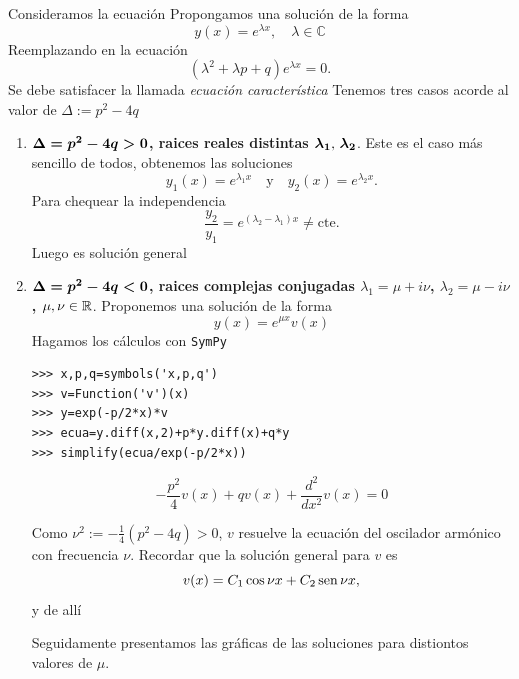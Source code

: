 Consideramos la ecuación
Propongamos una solución de la forma
\[\boxed{y(x)=e^{\lambda x},\quad \lambda\in\mathbb{C}}\]
Reemplazando en la ecuación
\[(\lambda^2+\lambda p+q)e^{\lambda x}=0.\]
Se debe satisfacer la llamada \emph{ecuación característica}
Tenemos tres casos acorde al valor de $\Delta:=p^2-4q$

\begin{enumerate}

\item \noindent \textbf{ $\b{\Delta=p^2-4q>0}$, raices reales distintas $\b{\lambda_1$, $\lambda_2}$}. Este es el caso más sencillo de todos, obtenemos las soluciones
\[y_1(x)=e^{\lambda_1 x}\quad\text{y}\quad y_2(x)=e^{\lambda_2 x}.\]
Para chequear la independencia
\[\frac{y_2}{y_1}=e^{(\lambda_2-\lambda_1)x}\neq\text{cte}.\]
Luego
es solución general


\item \noindent  \textbf{$\b{\Delta=p^2-4q<0}$, raices complejas conjugadas $\lambda_1=\mu+i\nu$, $\lambda_2=\mu-i\nu$, $\mu,\nu\in\rr$}.
Proponemos una solución de la forma
\[
y(x)=e^{\mu x}v(x)
\]
Hagamos los cálculos con \texttt{SymPy}





\begin{lstlisting}
>>> x,p,q=symbols('x,p,q')
>>> v=Function('v')(x)
>>> y=exp(-p/2*x)*v
>>> ecua=y.diff(x,2)+p*y.diff(x)+q*y
>>> simplify(ecua/exp(-p/2*x))

\end{lstlisting}

\[-\frac{p^{2}}{4} v{\left (x \right )} + q v{\left (x \right )} + \frac{d^{2}}{d x^{2}}  v{\left (x \right )}=0
 \]

Como $\nu^2:=-\frac{1}{4}(p^2-4q)>0$, $v$ resuelve  la ecuación del oscilador armónico con frecuencia $\nu$. Recordar que la solución general
para $v$ es
\[v(x)=C_1\cos \nu x +C_2\sen \nu x,\]
y de allí

Seguidamente presentamos las gráficas de las soluciones para distiontos valores de $\mu$.


\end{enumerate}
